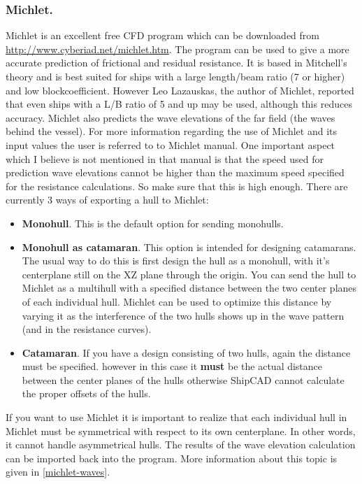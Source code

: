\documentclass[12pt]{article}
\begin{document}
\subsubsection{Michlet.} \label{michlet}
Michlet is an excellent free CFD program which can be downloaded from
\url{http://www.cyberiad.net/michlet.htm}. The program can be used to give a more accurate prediction
of frictional and residual resistance. It is based in Mitchell's
theory and is best suited for ships with a large length/beam ratio (7
or higher) and low blockcoefficient. However Leo Lazauskas, the author
of Michlet, reported that even ships with a L/B ratio of 5 and up may
be used, although this reduces accuracy. Michlet also predicts the
wave elevations of the far field (the waves behind the vessel). For
more information regarding the use of Michlet and its input values the
user is referred to to Michlet manual.  One important aspect which I
believe is not mentioned in that manual is that the speed used for
prediction wave elevations cannot be higher than the maximum speed
specified for the resistance calculations. So make sure that this is
high enough.  There are currently 3 ways of exporting a hull to
Michlet:

\begin{itemize}

  \item \textbf{Monohull}. This is the default option for sending monohulls.

  \item \textbf{Monohull as catamaran}. This option is intended for designing catamarans. The usual
way to do this is first design the hull as a monohull, with it's centerplane still on the XZ
plane through the origin. You can send the hull to Michlet as a multihull with a specified
distance between the two center planes of each individual hull. Michlet can be used to
optimize this distance by varying it as the interference of the two hulls shows up in the
wave pattern (and in the resistance curves).

  \item \textbf{Catamaran}. If you have a design consisting of two hulls, again the distance must be
specified. however in this case it \textbf{must} be the actual distance between the center planes
of the hulls otherwise ShipCAD cannot calculate the proper offsets of
the hulls.

\end{itemize}

If you want to use Michlet it is important to realize that each
individual hull in Michlet must be symmetrical with respect to its own
centerplane. In other words, it cannot handle asymmetrical hulls.  The
results of the wave elevation calculation can be imported back into
the program. More information about this topic is given in \ref{michlet-waves}.
\end{document}
